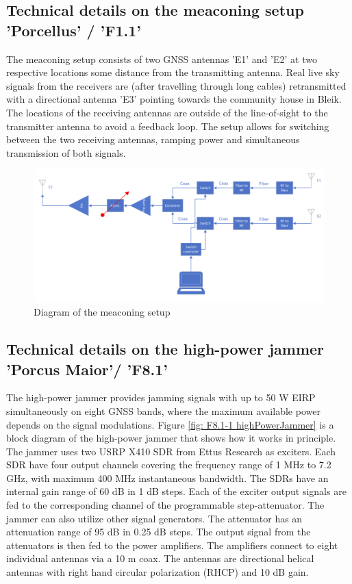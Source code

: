 




\subsection{Technical details on the meaconing setup 'Porcellus' / 'F1.1'}
The meaconing setup consists of two GNSS antennas 'E1' and 'E2' at two respective locations some
distance from the transmitting antenna. Real live sky signals from the receivers are (after travelling
through long cables) retransmitted with a directional antenna 'E3' pointing towards the community
house in Bleik. The locations of the receiving antennas are outside of the line-of-sight to the
transmitter antenna to avoid a feedback loop. The setup allows for switching between the two
receiving antennas, ramping power and simultaneous transmission of both signals.
\begin{figure}[H]
    \includegraphics[width=\textwidth]{graphics/appendixG/meaconingSetup.png}
    \caption{Diagram of the meaconing setup}
\end{figure}

\subsection{Technical details on the high-power jammer 'Porcus Maior'/ 'F8.1'}
The high-power jammer provides jamming signals with up to 50 W EIRP simultaneously on eight GNSS
bands, where the maximum available power depends on the signal modulations. Figure \ref{fig: F8.1-1 highPowerJammer} is a
block diagram of the high-power jammer that shows how it works in principle. The jammer uses two
USRP X410 SDR from Ettus Research as exciters. Each SDR have four output channels covering the
frequency range of 1 MHz to 7.2 GHz, with maximum 400 MHz instantaneous bandwidth. The SDRs
have an internal gain range of 60 dB in 1 dB steps. Each of the exciter output signals are fed to the
corresponding channel of the programmable step-attenuator. The jammer can also utilize other signal
generators. The attenuator has an attenuation range of 95 dB in 0.25 dB steps. The output signal from
the attenuators is then fed to the power amplifiers. The amplifiers connect to eight individual
antennas via a 10 m coax. The antennas are directional helical antennas with right hand circular
polarization (RHCP) and 10 dB gain.

